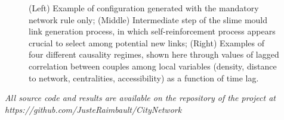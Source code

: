 \begin{figure}[h]
\begin{minipage}[b]{0.42\linewidth}
\end{minipage}
\caption{(Left) Example of configuration generated with the mandatory network rule only; (Middle) Intermediate step of the slime mould link generation process, in which self-reinforcement process appears crucial to select among potential new links; (Right) Examples of four different causality regimes, shown here through values of lagged correlation between couples among local variables (density, distance to network, centralities, accessibility) as a function of time lag.}
\end{figure}

\textit{All source code and results are available on the repository of the project at https://github.com/JusteRaimbault/CityNetwork}







%
%



